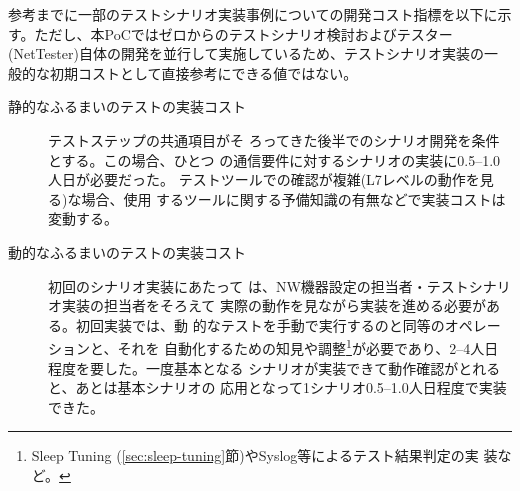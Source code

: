 参考までに一部のテストシナリオ実装事例についての開発コスト指標を以下に示
す。ただし、本PoCではゼロからのテストシナリオ検討およびテスター
(NetTester)自体の開発を並行して実施しているため、テストシナリオ実装の一
般的な初期コストとして直接参考にできる値ではない。
\begin{description}
 \item[静的なふるまいのテストの実装コスト] テストステップの共通項目がそ
            ろってきた後半でのシナリオ開発を条件とする。この場合、ひとつ
            の通信要件に対するシナリオの実装に0.5--1.0人日が必要だった。
            テストツールでの確認が複雑(L7レベルの動作を見る)な場合、使用
            するツールに関する予備知識の有無などで実装コストは変動する。
 \item[動的なふるまいのテストの実装コスト] 初回のシナリオ実装にあたって
            は、NW機器設定の担当者・テストシナリオ実装の担当者をそろえて
            実際の動作を見ながら実装を進める必要がある。初回実装では、動
            的なテストを手動で実行するのと同等のオペレーションと、それを
            自動化するための知見や調整\footnote{Sleep Tuning
            (\ref{sec:sleep-tuning}節)やSyslog等によるテスト結果判定の実
            装など。}が必要であり、2--4人日程度を要した。一度基本となる
            シナリオが実装できて動作確認がとれると、あとは基本シナリオの
            応用となって1シナリオ0.5--1.0人日程度で実装できた。
\end{description}

